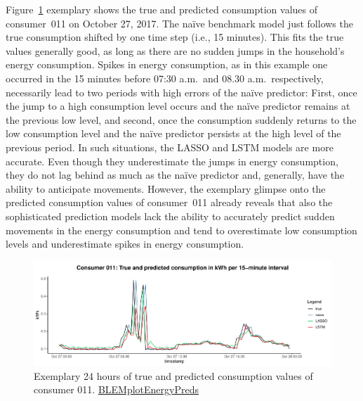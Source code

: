 Figure~\ref{Fig:glimpse_predcons} exemplary shows the true and predicted consumption values of consumer~011 on October 27, 2017. The na\"ive benchmark model just follows the true consumption shifted by one time step (i.e., 15 minutes). This fits the true values generally good, as long as there are no sudden jumps in the household's energy consumption. Spikes in energy consumption, as in this example one occurred in the 15 minutes before 07:30 a.m.~and 08.30 a.m.~respectively, necessarily lead to two periods with high errors of the na\"ive predictor: First, once the jump to a high consumption level occurs and the na\"ive predictor remains at the previous low level, and second, once the consumption suddenly returns to the low consumption level and the na\"ive predictor persists at the high level of the previous period. In such situations, the LASSO and LSTM models are more accurate. Even though they underestimate the jumps in energy consumption, they do not lag behind as much as the na\"ive predictor and, generally, have the ability to anticipate movements. However, the exemplary glimpse onto the predicted consumption values of consumer~011 already reveals that also the sophisticated prediction models lack the ability to accurately predict sudden movements in the energy consumption and tend to overestimate low consumption levels and underestimate spikes in energy consumption.
%
\begin{figure}[htbp]
    \centering
    \includegraphics[width=\textwidth]{thesis/graphs/evaluation/c011_pred_cons.pdf}
    \caption[Exemplary 24 hours of true and predicted consumption values]{Exemplary 24 hours of true and predicted consumption values of consumer 011. \quantnet\href{https://github.com/QuantLet/BLEM/tree/master/BLEMplotEnergyPreds}{BLEMplotEnergyPreds}}
    \label{Fig:glimpse_predcons}
\end{figure}
%

